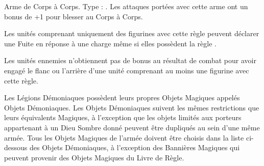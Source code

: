 \enditemlistonecol


\startitemlistonecol

\listitemonecol{\barbedclaws} Arme de Corps à Corps. Type : \hw{}. Les attaques portées avec cette arme ont un bonus de +1 pour blesser au Corps à Corps.

\listitemonecol{\elusive} Les unités comprenant uniquement des figurines avec cette règle peuvent déclarer une Fuite en réponse à une charge même si elles possèdent la règle \immunetopsychology{}.

\enditemlistonecol


\startitemlistonecol

\listitemonecol{\trailofmucus} Les unités ennemies n'obtiennent pas de bonus au résultat de combat pour avoir engagé le flanc ou l'arrière d'une unité comprenant au moins une figurine avec cette règle.

\enditemlistonecol

\closearmyarmoury









\spaceaftersection{}

Les Légions Démoniaques possèdent leurs propres Objets Magiques appelés Objets Démoniaques. Les Objets Démoniaques suivent les mêmes restrictions que leurs équivalents Magiques, à l'exception que les objets limités aux porteurs appartenant à un Dieu Sombre donné peuvent être dupliqués au sein d'une même armée. Tous les Objets Magiques de l'armée doivent être choisis dans la liste ci-dessous des Objets Démoniaques, à l'exception des Bannières Magiques qui peuvent provenir des Objets Magiques du Livre de Règle. 

